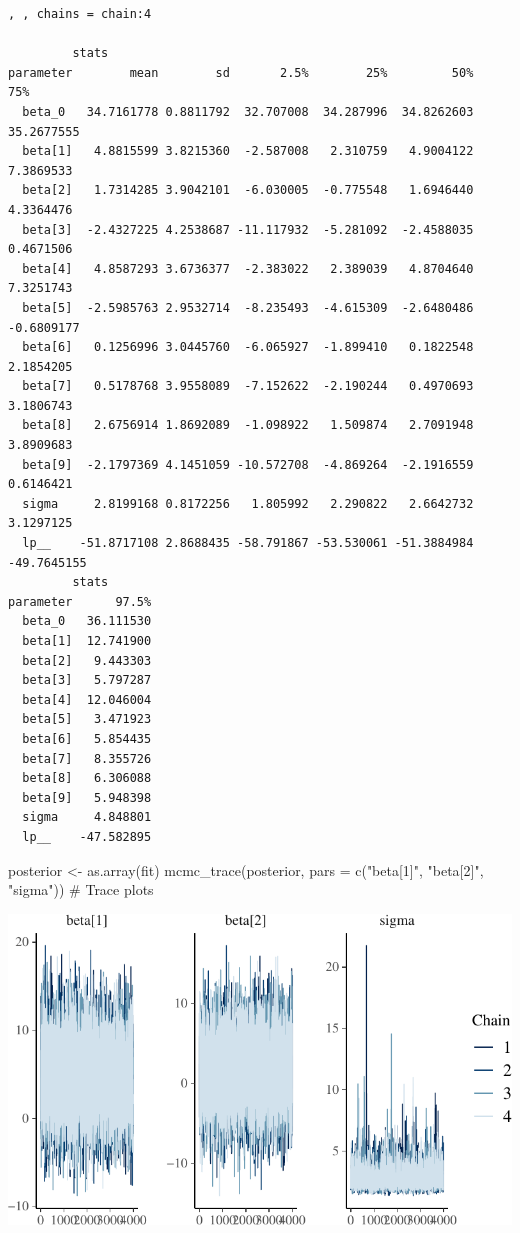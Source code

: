 \documentclass[
  10pt,
]{article}
\newenvironment{Shaded}{\begin{snugshade}}{\end{snugshade}}
\newcommand{\AttributeTok}[1]{\textcolor[rgb]{0.40,0.45,0.13}{#1}}
\newcommand{\CommentTok}[1]{\textcolor[rgb]{0.37,0.37,0.37}{#1}}
\newcommand{\FunctionTok}[1]{\textcolor[rgb]{0.28,0.35,0.67}{#1}}
\newcommand{\NormalTok}[1]{\textcolor[rgb]{0.00,0.23,0.31}{#1}}
\newcommand{\OtherTok}[1]{\textcolor[rgb]{0.00,0.23,0.31}{#1}}
\newcommand{\StringTok}[1]{\textcolor[rgb]{0.13,0.47,0.30}{#1}}
\begin{document}
\begin{verbatim}
, , chains = chain:4

         stats
parameter        mean        sd       2.5%        25%         50%         75%
  beta_0   34.7161778 0.8811792  32.707008  34.287996  34.8262603  35.2677555
  beta[1]   4.8815599 3.8215360  -2.587008   2.310759   4.9004122   7.3869533
  beta[2]   1.7314285 3.9042101  -6.030005  -0.775548   1.6946440   4.3364476
  beta[3]  -2.4327225 4.2538687 -11.117932  -5.281092  -2.4588035   0.4671506
  beta[4]   4.8587293 3.6736377  -2.383022   2.389039   4.8704640   7.3251743
  beta[5]  -2.5985763 2.9532714  -8.235493  -4.615309  -2.6480486  -0.6809177
  beta[6]   0.1256996 3.0445760  -6.065927  -1.899410   0.1822548   2.1854205
  beta[7]   0.5178768 3.9558089  -7.152622  -2.190244   0.4970693   3.1806743
  beta[8]   2.6756914 1.8692089  -1.098922   1.509874   2.7091948   3.8909683
  beta[9]  -2.1797369 4.1451059 -10.572708  -4.869264  -2.1916559   0.6146421
  sigma     2.8199168 0.8172256   1.805992   2.290822   2.6642732   3.1297125
  lp__    -51.8717108 2.8688435 -58.791867 -53.530061 -51.3884984 -49.7645155
         stats
parameter      97.5%
  beta_0   36.111530
  beta[1]  12.741900
  beta[2]   9.443303
  beta[3]   5.797287
  beta[4]  12.046004
  beta[5]   3.471923
  beta[6]   5.854435
  beta[7]   8.355726
  beta[8]   6.306088
  beta[9]   5.948398
  sigma     4.848801
  lp__    -47.582895
\end{verbatim}

\begin{Shaded}
\begin{Highlighting}[]
\NormalTok{posterior }\OtherTok{\textless{}{-}} \FunctionTok{as.array}\NormalTok{(fit)}
\FunctionTok{mcmc\_trace}\NormalTok{(posterior, }\AttributeTok{pars =} \FunctionTok{c}\NormalTok{(}\StringTok{"beta[1]"}\NormalTok{, }\StringTok{"beta[2]"}\NormalTok{, }\StringTok{"sigma"}\NormalTok{)) }\CommentTok{\# Trace plots}
\end{Highlighting}
\end{Shaded}

\includegraphics{551-HW-Q2_files/figure-pdf/unnamed-chunk-4-2.pdf}
\end{document}
